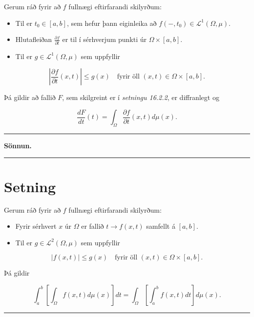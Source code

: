 \documentclass[]{book}
\begin{document}
Gerum ráð fyrir að \(f\) fullnægi eftirfarandi skilyrðum:

\begin{itemize}
\item
  Til er \(t_0\in[a,b]\), sem hefur þann eiginleika að \(f(-,t_0)\in\mathcal L^1(\Omega,\mu)\).
\item
  Hlutafleiðan \(\frac{\partial f}{\partial t}\) er til í sérhverjum punkti úr \(\Omega\times[a,b]\).
\item
  Til er \(g\in\mathcal L^1(\Omega,\mu)\) sem uppfyllir
\end{itemize}

\[
\left| \frac{\partial f}{\partial t}(x,t)  \right| \leq g(x) \quad\text{fyrir öll } (x,t)\in\Omega\times[a,b].
\]

Þá gildir að fallið \(F\), sem skilgreint er í \emph{setningu 16.2.2}, er diffranlegt og

\[
\frac{dF}{dt}(t) = \int_\Omega \frac{\partial f}{\partial t}(x,t)d\mu(x).
\]

\begin{center}\rule{0.5\linewidth}{\linethickness}\end{center}

\textbf{Sönnun.}

\begin{center}\rule{0.5\linewidth}{\linethickness}\end{center}

\hypertarget{setning-62}{%
\section{Setning}\label{setning-62}}

Gerum ráð fyrir að \(f\) fullnægi eftirfarandi skilyrðum:

\begin{itemize}
\item
  Fyrir sérhvert \(x\) úr \(\Omega\) er fallið \(t\rightarrow f(x,t)\) samfellt á \([a,b]\).
\item
  Til er \(g\in\mathcal L^2(\Omega,\mu)\) sem uppfyllir
\end{itemize}

\[
|f(x,t)|\leq g(x) \quad \text{fyrir öll }(x,t)\in\Omega\times[a,b].
\]

Þá gildir

\[
\int_a^b\left[\int_\Omega f(x,t)d\mu(x)\right]dt = \int_\Omega\left[\int_a^b f(x,t)dt\right]d\mu(x).
\]

\begin{center}\rule{0.5\linewidth}{\linethickness}\end{center}
\end{document}
